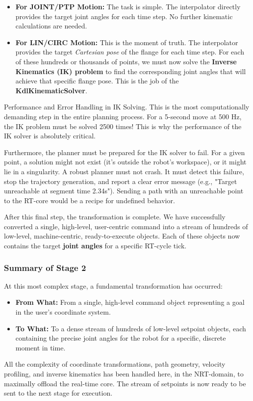 \begin{itemize}
    \item \textbf{For JOINT/PTP Motion:} The task is simple. The interpolator directly provides the target joint angles for each time step. No further kinematic calculations are needed.
    \item \textbf{For LIN/CIRC Motion:} This is the moment of truth. The interpolator provides the target \textit{Cartesian pose} of the flange for each time step. For each of these hundreds or thousands of points, we must now solve the \textbf{Inverse Kinematics (IK) problem} to find the corresponding joint angles that will achieve that specific flange pose. This is the job of the \textbf{KdlKinematicSolver}.
\end{itemize}

\begin{dangerbox}{Performance and Error Handling in IK Solving.}
    This is the most computationally demanding step in the entire planning process. For a 5-second move at 500 Hz, the IK problem must be solved 2500 times! This is why the performance of the IK solver is absolutely critical.
    
    Furthermore, the planner must be prepared for the IK solver to fail. For a given point, a solution might not exist (it's outside the robot's workspace), or it might lie in a singularity. A robust planner must not crash. It must detect this failure, stop the trajectory generation, and report a clear error message (e.g., "Target unreachable at segment time 2.34s"). Sending a path with an unreachable point to the RT-core would be a recipe for undefined behavior.
\end{dangerbox}

After this final step, the transformation is complete. We have successfully converted a single, high-level, user-centric command into a stream of hundreds of low-level, machine-centric, ready-to-execute  objects. Each of these objects now contains the target \textbf{joint angles} for a specific RT-cycle tick.

\subsubsection{Summary of Stage 2}
\label{subsubsec:stage2_summary}

At this most complex stage, a fundamental transformation has occurred:
\begin{itemize}
    \item \textbf{From What:} From a single, high-level command object representing a goal in the user's coordinate system.
    \item \textbf{To What:} To a dense stream of hundreds of low-level setpoint objects, each containing the precise joint angles for the robot for a specific, discrete moment in time.
\end{itemize}
All the complexity of coordinate transformations, path geometry, velocity profiling, and inverse kinematics has been handled here, in the NRT-domain, to maximally offload the real-time core. The stream of setpoints is now ready to be sent to the next stage for execution.

